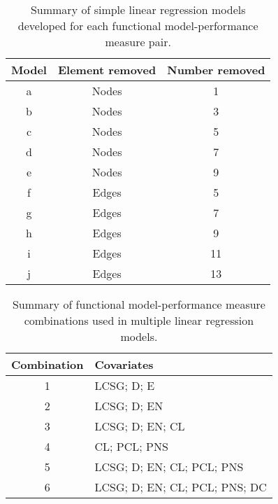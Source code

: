 \begin{table}
\centering

\begin{tabular}{ccc}
\toprule
{\textbf{Model}} & {\textbf{Element removed}} & {\textbf{Number removed}}\\
\midrule
a & Nodes & 1 \\
b & Nodes & 3 \\
c & Nodes & 5 \\
d & Nodes & 7 \\
e & Nodes & 9 \\
f & Edges & 5 \\
g & Edges & 7 \\
h & Edges & 9 \\
i & Edges & 11 \\
j & Edges & 13 \\
\bottomrule
\end{tabular}

\caption[Summary of simple linear regression models for functional model-performance measure pairs.]{\label{tab:ch3:simplinreg}Summary of simple linear regression models developed for each functional model-performance measure pair.}

\end{table}




\begin{table}
\centering

\begin{tabular}{c l}
\toprule
{\textbf{Combination}} & {\textbf{Covariates}}\\
\midrule
1 & LCSG; D; E \\
2 & LCSG; D; EN \\
3 & LCSG; D; EN; CL \\
4 & CL; PCL; PNS \\
5 & LCSG; D; EN; CL; PCL; PNS \\
6 & LCSG; D; EN; CL; PCL; PNS; DC \\
\bottomrule
\end{tabular}

\caption[Summary of functional model-performance measure combinations used in multiple linear regression models.]{\label{tab:ch3:multlinreg}Summary of functional model-performance measure combinations used in multiple linear regression models.}

\end{table}

